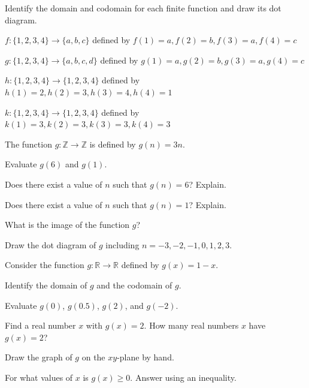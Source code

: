 \begin{exer}[\exerP] %
\label{exer_domain_codomain_finite} 
    Identify the domain and codomain for each finite function and draw its dot diagram.
        \begin{exerpart}            
            \item \label{part_first_dot_finite} $f: \{1, 2, 3, 4\} \to \{a, b, c\}$ defined by $f(1) = a, f(2) = b, f(3) = a, f(4) = c$
            \item $g: \{1, 2, 3, 4\} \to \{a, b, c, d\}$ defined by $g(1) = a, g(2) = b, g(3) = a, g(4) = c$
            \item \label{part_third_dot_finite} $h: \{1, 2, 3, 4\} \to \{1,2,3,4\}$ defined by $h(1) = 2, h(2) = 3, h(3) = 4, h(4) = 1$
            \item $k: \{1, 2, 3, 4\} \to \{1,2,3,4\}$ defined by $k(1) = 3, k(2) = 3, k(3) = 3, k(4) =3$
        \end{exerpart}  
\end{exer}

\begin{exer}[\exerP] %
\label{exer_nmapsto3n}
    The function $g: \mathbb{Z} \to \mathbb{Z}$ is defined by $g(n) = 3n$.
        \begin{exerpart}
            \item Evaluate $g(6)$ and $g(1)$. 
            \item Does there exist a value of $n$ such that  $g(n)=6$? Explain.
            \item Does there exist a value of $n$ such that $g(n)=1$? Explain.
            \item What is the image of the function $g$?
            \item Draw the dot diagram of $g$ including $n=-3,-2,-1,0,1,2,3$.
        \end{exerpart}
\end{exer}

\begin{exer}[\exerP] %
\label{exer_1minusx}
    Consider the function $g: \mathbb{R} \to \mathbb{R}$ defined by $g(x) = 1-x$.
        \begin{exerpart}
            \item Identify the domain of $g$ and the codomain of $g$.
            \item Evaluate $g(0)$, $g(0.5)$, $g(2)$, and $g(-2)$.
            \item Find a real number $x$ with $g(x) = 2$.  How many real numbers $x$ have $g(x) = 2$?
            \item Draw the graph of $g$ on the $xy$-plane by hand.
            \item For what values of $x$ is $g(x) \ge 0$.  Answer using an inequality.%
        \end{exerpart}    
\end{exer}

